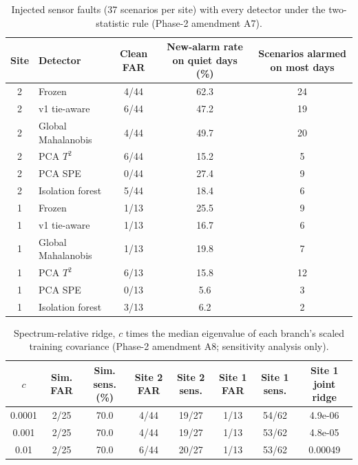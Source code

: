 \begin{table}[h!]\centering\footnotesize\caption{Injected sensor faults (37 scenarios per site) with every detector under the two-statistic rule (Phase-2 amendment A7).}\label{tab:S12}
\begin{tabular}{clccc}\toprule
Site & Detector & Clean FAR & New-alarm rate on quiet days (\%) & Scenarios alarmed on most days\\\midrule
2 & Frozen & 4/44 & 62.3 & 24\\
2 & v1 tie-aware & 6/44 & 47.2 & 19\\
2 & Global Mahalanobis & 4/44 & 49.7 & 20\\
2 & PCA $T^2$ & 6/44 & 15.2 & 5\\
2 & PCA SPE & 0/44 & 27.4 & 9\\
2 & Isolation forest & 5/44 & 18.4 & 6\\
1 & Frozen & 1/13 & 25.5 & 9\\
1 & v1 tie-aware & 1/13 & 16.7 & 6\\
1 & Global Mahalanobis & 1/13 & 19.8 & 7\\
1 & PCA $T^2$ & 6/13 & 15.8 & 12\\
1 & PCA SPE & 0/13 & 5.6 & 3\\
1 & Isolation forest & 3/13 & 6.2 & 2\\
\bottomrule\end{tabular}\end{table}

\begin{table}[h!]\centering\footnotesize\caption{Spectrum-relative ridge, $c$ times the median eigenvalue of each branch's scaled training covariance (Phase-2 amendment A8; sensitivity analysis only).}\label{tab:S13}
\begin{tabular}{cccccccc}\toprule
$c$ & Sim. FAR & Sim. sens. (\%) & Site 2 FAR & Site 2 sens. & Site 1 FAR & Site 1 sens. & Site 1 joint ridge\\\midrule
0.0001 & 2/25 & 70.0 & 4/44 & 19/27 & 1/13 & 54/62 & 4.9e-06\\
0.001 & 2/25 & 70.0 & 4/44 & 19/27 & 1/13 & 53/62 & 4.8e-05\\
0.01 & 2/25 & 70.0 & 6/44 & 20/27 & 1/13 & 53/62 & 0.00049\\
\bottomrule\end{tabular}\end{table}

